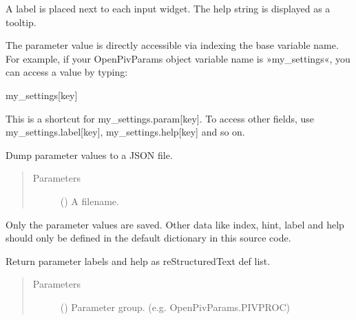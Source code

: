 \documentclass[letterpaper,10pt,english]{sphinxmanual}
\begin{document}
\begin{fulllineitems}
A label is placed next to each input widget. The help string is
displayed as a tooltip.

The parameter value is directly accessible via indexing the base
variable name. For example, if your OpenPivParams object variable
name is »my\_settings«, you can access a value by typing:

my\_settings{[}key{]}

This is a shortcut for my\_settings.param{[}key{]}. To access other
fields, use my\_settings.label{[}key{]}, my\_settings.help{[}key{]} and so on.

\begin{fulllineitems}
\label{\detokenize{openpivparams:openpivgui.OpenPivParams.OpenPivParams.dump_settings}}
Dump parameter values to a JSON file.
\begin{quote}\begin{description}
\item[{Parameters}] \leavevmode
{} () \textendash{} A filename.

\end{description}\end{quote}

Only the parameter values are saved. Other data like
index, hint, label and help should only be defined in the
default dictionary in this source code.

\end{fulllineitems}


\begin{fulllineitems}
\label{\detokenize{openpivparams:openpivgui.OpenPivParams.OpenPivParams.generate_parameter_documentation}}
Return parameter labels and help as reStructuredText def list.
\begin{quote}\begin{description}
\item[{Parameters}] \leavevmode
{} () \textendash{} Parameter group.
(e.g. OpenPivParams.PIVPROC)


\end{description}
\end{quote}
\end{fulllineitems}
\end{fulllineitems}
\end{document}

